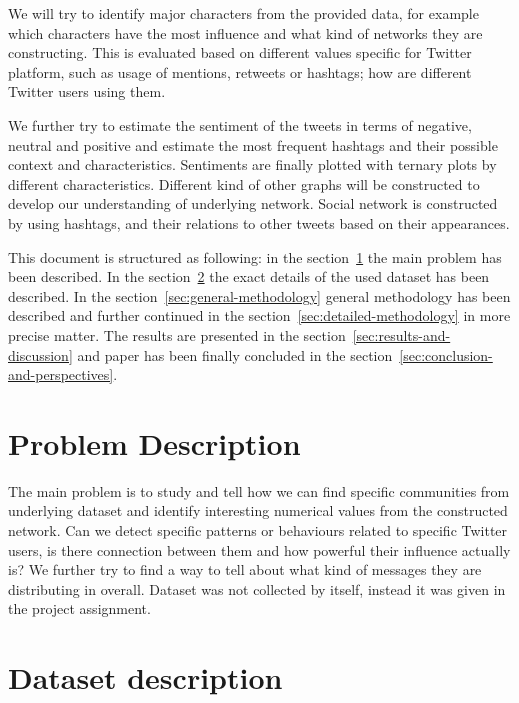 \documentclass[conference]{IEEEtran}
\begin{document}
We will try to identify major characters from the provided data, for example which characters have the most influence and
what kind of networks they are constructing.
This is evaluated based on different values specific for Twitter platform, such as usage of mentions, retweets or hashtags; how are different Twitter users using them.

We further try to estimate the sentiment of the tweets in terms of negative, neutral and positive and estimate the most
frequent hashtags and their possible context and characteristics.
Sentiments are finally plotted with ternary plots by different characteristics.
Different kind of other graphs will be constructed to develop our understanding of underlying network.
Social network is constructed by using hashtags, and their relations to other tweets based on their appearances.

This document is structured as following: in the section~\ref{sec:problem-description} the main problem has been described.
In the section~\ref{sec:dataset-description} the exact details of the used dataset has been described.
In the section~\ref{sec:general-methodology} general methodology has been described and further continued in the section~\ref{sec:detailed-methodology}
in more precise matter.
The results are presented in the section~\ref{sec:results-and-discussion} and paper has been finally concluded in the section~\ref{sec:conclusion-and-perspectives}.

\section{Problem Description}\label{sec:problem-description}

The main problem is to study and tell how we can find specific communities from underlying dataset and identify interesting
numerical values from the constructed network.
Can we detect specific patterns or behaviours related to specific Twitter users, is there connection between them and how powerful their influence actually is?
We further try to find a way to tell about what kind of messages they are distributing in overall.
Dataset was not collected by itself, instead it was given in the project assignment.

\section{Dataset description}\label{sec:dataset-description}
\end{document}
